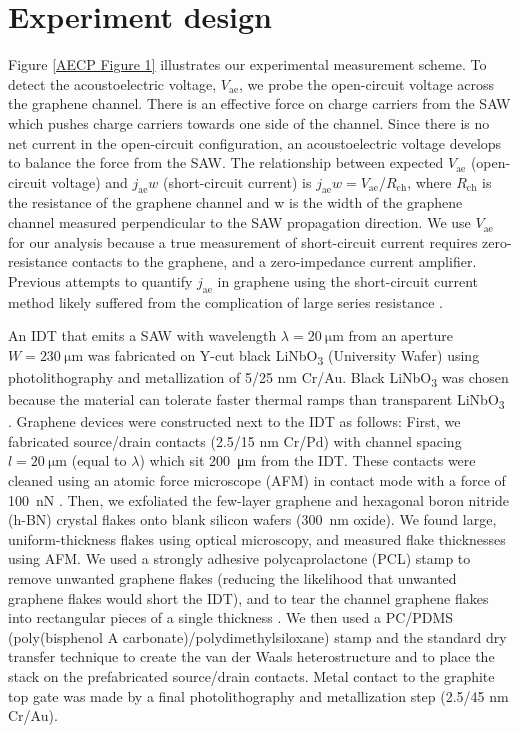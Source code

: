 \documentclass{beavtex_dub_edit}
\begin{document}
\section{Experiment design} \label{charge pumping paper experiment design}
Figure \ref{AECP Figure 1} illustrates our experimental measurement scheme. To detect the acoustoelectric voltage, $V_{\mathrm{ae}}$, we probe the open-circuit voltage across the graphene channel. There is an effective force on charge carriers from the SAW which pushes charge carriers towards one side of the channel.  Since there is no net current in the open-circuit configuration, an acoustoelectric voltage develops to balance the force from the SAW. The relationship between expected $V_{\mathrm{ae}}$ (open-circuit voltage) and $j_{\mathrm{ae}}w$ (short-circuit current) is $j_{\mathrm{ae}}w = V_{\mathrm{ae}}$/$R_{\mathrm{ch}}$, where $R_{\mathrm{ch}}$ is the resistance of the graphene channel and w is the width of the graphene channel measured perpendicular to the SAW propagation direction. We use $V_{\mathrm{ae}}$ for our analysis because a true measurement of short-circuit current requires zero-resistance contacts to the graphene, and a zero-impedance current amplifier. Previous attempts to quantify $j_{\mathrm{ae}}$ in graphene using the short-circuit current method likely suffered from the complication of large series resistance \cite{bandhu_macroscopic_2013,bandhu_controlling_2016,okuda_acoustic_2016,tang_ultra-low_2017,okuda_graphene_2018}. 

An IDT that emits a SAW with wavelength $\lambda =  \SI{20}{\micro\meter}$ from an aperture $W = \SI{230}{\micro\meter}$ was fabricated on Y-cut black LiNbO\textsubscript{3} (University Wafer) using photolithography and metallization of 5/25 nm Cr/Au. Black LiNbO\textsubscript{3} was chosen because the material can tolerate faster thermal ramps than transparent LiNbO\textsubscript{3}  \cite{fang_quantum_2023,lane_flip-chip_2018}. Graphene devices were constructed next to the IDT as follows: First, we fabricated source/drain contacts (2.5/15 nm Cr/Pd) with channel spacing $l = \SI{20}{\micro\meter}$ (equal to $\lambda$) which sit \SI{200}{\micro\meter} from the IDT. These contacts were cleaned using an atomic force microscope (AFM) in contact mode with a force of \SI{100}{\nano\newton} \cite{goossens_mechanical_2012}. Then, we exfoliated the few-layer graphene and hexagonal boron nitride (h-BN) crystal flakes onto blank silicon wafers (\SI{300}{\nano\meter} oxide). We found large, uniform-thickness flakes using optical microscopy, and measured flake thicknesses using AFM. We used a strongly adhesive polycaprolactone (PCL) stamp to remove unwanted graphene flakes (reducing the likelihood that unwanted graphene flakes would short the IDT), and to tear the channel graphene flakes into rectangular pieces of a single thickness \cite{son_strongly_2020}. We then used a PC/PDMS (poly(bisphenol A carbonate)/polydimethylsiloxane) stamp and the standard dry transfer technique \cite{wang_one-dimensional_2013} to create the van der Waals heterostructure and to place the stack on the prefabricated source/drain contacts. Metal contact to the graphite top gate was made by a final photolithography and metallization step (2.5/45 nm Cr/Au).
\end{document}
